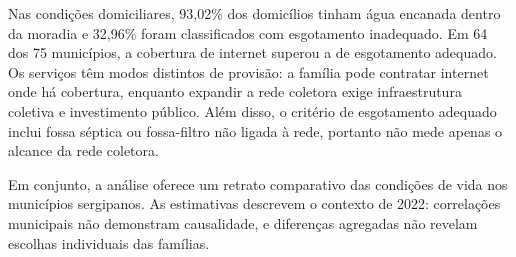 \documentclass[a4paper,12pt]{article}
\begin{document}
Nas condições domiciliares, 93,02\% dos domicílios tinham água encanada dentro da moradia e 32,96\% foram classificados com esgotamento inadequado. Em 64 dos 75 municípios, a cobertura de internet superou a de esgotamento adequado. Os serviços têm modos distintos de provisão: a família pode contratar internet onde há cobertura, enquanto expandir a rede coletora exige infraestrutura coletiva e investimento público. Além disso, o critério de esgotamento adequado inclui fossa séptica ou fossa-filtro não ligada à rede, portanto não mede apenas o alcance da rede coletora.

Em conjunto, a análise oferece um retrato comparativo das condições de vida nos municípios sergipanos. As estimativas descrevem o contexto de 2022: correlações municipais não demonstram causalidade, e diferenças agregadas não revelam escolhas individuais das famílias.


\renewcommand{\refname}{\centering REFERÊNCIAS}

{\singlespacing
\clearpage

}
\end{document}
